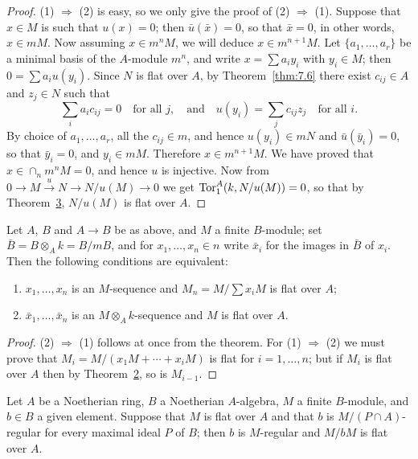 \begin{proof}
(1) $\Rightarrow$ (2) is easy, so we only give the proof of (2) $\Rightarrow$ (1). Suppose that
$x \in M$ is such that $u(x) = 0$; then $\bar{u}(\bar{x}) = 0$, so that $\bar{x} = 0$, in
other words, $x \in mM$. Now assuming $x \in m^nM$, we will deduce $x \in m^{n+1}M$.
Let $\{a_1, \ldots, a_r\}$ be a minimal basis of the $A$-module $m^n$, and write
$x = \sum a_i y_i$ with $y_i \in M$; then $0 = \sum a_i u(y_i)$. Since $N$ is flat over
$A$, by Theorem~\ref{thm:7.6} there exist $c_{ij} \in A$ and $z_j \in N$ such that
\[
  \sum_i a_i c_{ij} = 0 \quad \text{for all } j, \quad \text{and} \quad u(y_i) = \sum_j c_{ij}z_j \quad \text{for all } i.
\]
By choice of $a_1, \ldots, a_r$, all the $c_{ij} \in m$, and hence $u(y_i) \in mN$ and
$\bar{u}(\bar{y}_i) = 0$, so that $\bar{y}_i = 0$, and $y_i \in mM$. Therefore
$x \in m^{n+1}M$. We have proved that $x \in \cap_n m^nM = 0$, and hence $u$ is
injective. Now from $0 \to M \xrightarrow{u} N \to N/u(M) \to 0$ we get
$\operatorname{Tor}^A_1(k, N/u(M)) = 0$, so that by Theorem~\hyperref[thm:22.3]{3},
$N/u(M)$ is flat over $A$.
\end{proof}

\begin{corollary*}
Let $A$, $B$ and $A \to B$ be as above, and $M$ a finite $B$-module; set
$\bar{B} = B \otimes_A k = B/mB$, and for $x_1, \ldots, x_n \in n$ write $\bar{x}_i$ for the
images in $\bar{B}$ of $x_i$. Then the following conditions are equivalent:
\begin{enumerate}[(1)]
  \item $x_1, \ldots, x_n$ is an $M$-sequence and $M_n = M/\sum x_iM$ is flat over $A$;
  \item $\bar{x}_1, \ldots, \bar{x}_n$ is an $M \otimes_A k$-sequence and $M$ is flat over $A$.
\end{enumerate}
\end{corollary*}

\begin{proof}
(2) $\Rightarrow$ (1) follows at once from the theorem. For (1) $\Rightarrow$ (2) we must prove
that $M_i = M/(x_1M + \cdots + x_iM)$ is flat for $i = 1, \ldots, n$; but if $M_i$ is flat
over $A$ then by Theorem~\hyperref[thm:22.2]{2}, so is $M_{i-1}$.
\end{proof}

\begin{theorem}\label{thm:22.6}
Let $A$ be a Noetherian ring, $B$ a Noetherian $A$-algebra, $M$ a finite
$B$-module, and $b \in B$ a given element. Suppose that $M$ is flat over $A$ and
that $b$ is $M/(P \cap A)$-regular for every maximal ideal $P$ of $B$; then $b$ is
$M$-regular and $M/bM$ is flat over $A$.
\end{theorem}

